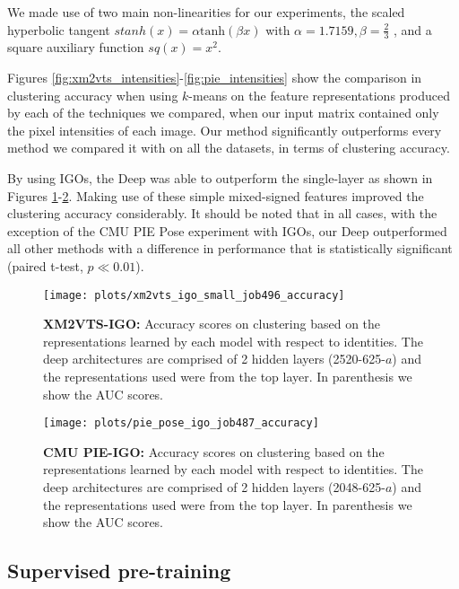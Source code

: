 \documentclass[10pt,journal,compsoc]{IEEEtran}
\begin{document}
We made use of two main non-linearities for our experiments, the scaled hyperbolic tangent $stanh(x) = \alpha \text{tanh}(\beta x)$ with $\alpha = 1.7159, \beta = \frac{2}{3}$ \cite{LeCun2012}, and a square auxiliary function $sq(x) = x^2$. 

Figures \ref*{fig:xm2vts_intensities}-\ref*{fig:pie_intensities} show the comparison in clustering accuracy when using $k$-means on the feature representations produced by each of the techniques we compared, when our input matrix contained only the pixel intensities of each image. Our method significantly outperforms every method we compared it with on all the datasets, in terms of clustering accuracy.
 
By using IGOs, the Deep \seminmf was able to outperform the single-layer \seminmf as shown in Figures \ref*{fig:xmvts_igo}-\ref*{fig:pie_igo}. Making use of these simple mixed-signed features improved the clustering accuracy considerably. It should be noted that in all cases, with the exception of the
CMU PIE Pose experiment with IGOs, our Deep \seminmf outperformed all other methods with a difference in performance that is statistically significant (paired t-test, $p
\ll 0.01$).

\begin{figure}
     \centering
     \texttt{[image: plots/xm2vts\_igo\_small\_job496\_accuracy]}
     \vspace{-2em}
     \caption{\textbf{XM2VTS-IGO: } Accuracy scores on clustering based on the representations learned by each model with respect to identities. The deep architectures are comprised of 2 hidden layers (2520-625-$a$) and the representations used were from the top layer. In parenthesis we show the AUC scores.}
     \label{fig:xmvts_igo}
\end{figure}
\begin{figure}[tb]
     \centering
     \texttt{[image: plots/pie\_pose\_igo\_job487\_accuracy]}
    \vspace{-2em}
    \caption{\textbf{CMU PIE-IGO: } Accuracy scores on clustering based on the representations learned by each model with respect to identities. The deep architectures are comprised of 2 hidden layers (2048-625-$a$) and the representations used were from the top layer. In parenthesis we show the AUC scores.}
     \label{fig:pie_igo}
\end{figure}


\subsection{Supervised pre-training}\label{sub:pretraining}
\end{document}
